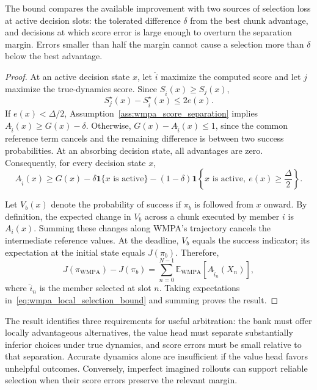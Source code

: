 \documentclass{article}
\theoremstyle{plain}
\theoremstyle{definition}
\theoremstyle{plain}
\newcommand{\wmpa}{\textsc{WMPA}}
\begin{document}
The bound compares the available improvement with two sources of
selection loss at active decision slots: the tolerated difference $\delta$
from the best chunk advantage, and decisions at which score error is
large enough to overturn the separation margin. Errors smaller than half
the margin cannot cause a selection more than $\delta$ below the best
advantage.

\begin{proof}
At an active decision state $x$, let $\hat i$ maximize the computed score
and let $j$ maximize the true-dynamics score. Since
$S_{\hat i}(x)\geq S_j(x)$,
\begin{equation}
    S_j^\star(x)-S_{\hat i}^\star(x)\leq 2e(x).
    \label{eq:wmpa_margin_stability}
\end{equation}
If $e(x)<\Delta/2$, Assumption~\ref{ass:wmpa_score_separation} implies
$A_{\hat i}(x)\geq G(x)-\delta$. Otherwise,
$G(x)-A_{\hat i}(x)\leq 1$, since the common reference term cancels and
the remaining difference is between two success probabilities.
At an absorbing decision state, all advantages are zero. Consequently,
for every decision state $x$,
\begin{equation}
    A_{\hat i}(x)
    \geq G(x)-\delta\mathbf{1}\{x\text{ is active}\}
    -(1-\delta)\mathbf{1}\!\left\{
        x\text{ is active},\ e(x)\geq\frac{\Delta}{2}\right\}.
    \label{eq:wmpa_local_selection_bound}
\end{equation}

Let $V_b(x)$ denote the probability of success if $\pi_b$ is followed
from $x$ onward. By definition, the expected change in $V_b$ across a
chunk executed by member $i$ is $A_i(x)$. Summing these changes along
\wmpa{}'s trajectory cancels the intermediate reference values. At the
deadline, $V_b$ equals the success indicator; its expectation at the
initial state equals $J(\pi_b)$. Therefore,
\begin{equation}
    J(\pi_{\mathrm{WMPA}})-J(\pi_b)
    =\sum_{n=0}^{N-1}
    \mathbb E_{\mathrm{WMPA}}[A_{\hat i_n}(X_n)],
    \label{eq:wmpa_advantage_identity}
\end{equation}
where $\hat i_n$ is the member selected at slot $n$. Taking expectations
in~\eqref{eq:wmpa_local_selection_bound} and summing proves the result.
\end{proof}

The result identifies three requirements for useful arbitration: the bank
must offer locally advantageous alternatives, the value head must
separate substantially inferior choices under true dynamics, and score
errors must be small relative to that separation. Accurate dynamics
alone are insufficient if the value head favors unhelpful outcomes.
Conversely, imperfect imagined rollouts can support reliable selection
when their score errors preserve the relevant margin.
\end{document}
